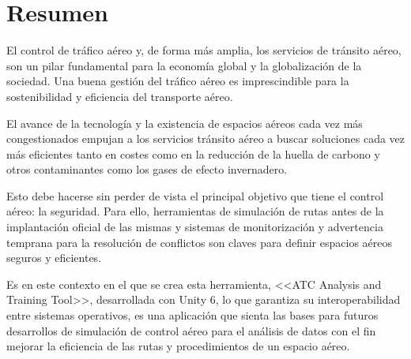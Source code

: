 \chapter*{Resumen}

El control de tráfico aéreo y, de forma más amplia, los servicios de tránsito aéreo, son un pilar fundamental para la economía global y la globalización de la sociedad. Una buena gestión del tráfico aéreo es imprescindible para la sostenibilidad y eficiencia del transporte aéreo.

El avance de la tecnología y la existencia de espacios aéreos cada vez más congestionados empujan a los servicios tránsito aéreo a buscar soluciones cada vez más eficientes tanto en costes como en la reducción de la huella de carbono y otros contaminantes como los gases de efecto invernadero.

Esto debe hacerse sin perder de vista el principal objetivo que tiene el control aéreo: la seguridad. Para ello, herramientas de simulación de rutas antes de la implantación oficial de las mismas y sistemas de monitorización y advertencia temprana para la resolución de conflictos son claves para definir espacios aéreos seguros y eficientes.

Es en este contexto en el que se crea esta herramienta, <<ATC Analysis and Training Tool>>, desarrollada con Unity 6, lo que garantiza su interoperabilidad entre sistemas operativos, es una aplicación que sienta las bases para futuros desarrollos de simulación de control aéreo para el análisis de datos con el fin mejorar la eficiencia de las rutas y procedimientos de un espacio aéreo.




%
%
